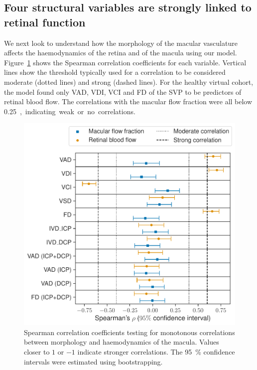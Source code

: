 \documentclass[11pt,]{article}
\begin{document}
\subsection{Four structural variables are strongly linked to retinal function}\label{sec:StructureAndFunction}

We next look to understand how the morphology of the macular vasculature affects the haemodynamics of the retina and of the macula using our model.
Figure~\ref{fig:SpearmanCorrelations} shows the Spearman correlation coefficients for each variable.
Vertical lines show the threshold typically used for a correlation to be considered moderate (dotted lines) and strong (dashed lines).
For the healthy virtual cohort, the model found only VAD, VDI, VCI and FD of the SVP to be predictors of retinal blood flow.
The correlations with the macular flow fraction were all below \SI{0.25}, indicating weak or no correlations.

\begin{figure}[ht!]
  \centering
  \includegraphics[width=.95\textwidth]{SpearmanCoefficients}
  \caption{\label{fig:SpearmanCorrelations}Spearman correlation coefficients testing for monotonous correlations between morphology and haemodynamics of the macula. Values closer to $1$ or $-1$ indicate stronger correlations. The \SI{95}{\percent} confidence intervals were estimated using bootstrapping.}
\end{figure}
\end{document}
